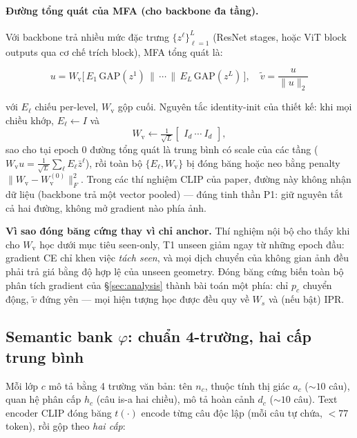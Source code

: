 \documentclass[10pt,twocolumn,letterpaper]{article}
\newcommand{\vtilde}{\tilde{v}}
\begin{document}
\paragraph{Đường tổng quát của MFA (cho backbone đa tầng).}
Với backbone trả nhiều mức đặc trưng $\{z^{\ell}\}_{\ell=1}^{L}$ (ResNet stages, hoặc ViT block outputs qua cơ chế trích block), MFA tổng quát là:

\begin{equation}
u = W_{\mathrm{v}}\big[\,E_1\,\mathrm{GAP}(z^{1})\,\|\,\cdots\,\|\,E_L\,\mathrm{GAP}(z^{L})\,\big],
\quad \vtilde = \frac{u}{\|u\|_2}
\label{eq:mfa-general}
\end{equation}

với $E_\ell$ chiếu per-level, $W_{\mathrm{v}}$ gộp cuối. Nguyên tắc identity-init của thiết kế: khi mọi chiều khớp, $E_\ell \leftarrow I$ và
\begin{equation}
W_{\mathrm{v}} \leftarrow \tfrac{1}{\sqrt{L}}
\begin{bmatrix} I_d \ \cdots\ I_d \end{bmatrix},
\label{eq:mfa-init}
\end{equation}
sao cho tại epoch 0 đường tổng quát là trung bình có scale của các tầng ($W_{\mathrm{v}}u = \frac{1}{\sqrt L}\sum_\ell E_\ell\bar z^\ell$), rồi toàn bộ $\{E_\ell, W_{\mathrm{v}}\}$ bị đóng băng hoặc neo bằng penalty $\|W_{\mathrm v}-W_{\mathrm v}^{(0)}\|_F^2$. Trong các thí nghiệm CLIP của paper, đường này không nhận dữ liệu (backbone trả một vector pooled) — đúng tinh thần P1: giữ nguyên tắt cả hai đường, không mở gradient nào phía ảnh.

\textbf{Vì sao đóng băng cứng thay vì chỉ anchor.} Thí nghiệm nội bộ cho thấy khi cho $W_{\mathrm v}$ học dưới mục tiêu seen-only, T1 unseen giảm ngay từ những epoch đầu: gradient CE chỉ khen việc \emph{tách seen}, và mọi dịch chuyển của không gian ảnh đều phải trả giá bằng độ hợp lệ của unseen geometry. Đóng băng cứng biến toàn bộ phân tích gradient của §\ref{sec:analysis} thành bài toán một phía: chỉ $p_c$ chuyển động, $\vtilde$ đứng yên — mọi hiện tượng học được đều quy về $W_s$ và (nếu bật) IPR.

\subsection{Semantic bank $\varphi$: chuẩn 4-trường, hai cấp trung bình}
\label{sec:phi}

Mỗi lớp $c$ mô tả bằng 4 trường văn bản: tên $n_c$, thuộc tính thị giác $a_c$ (${\sim}10$ câu), quan hệ phân cấp $h_c$ (câu is-a hai chiều), mô tả hoàn cảnh $d_c$ (${\sim}10$ câu). Text encoder CLIP đóng băng $t(\cdot)$ encode từng câu độc lập (mỗi câu tự chứa, $<77$ token), rồi gộp theo \emph{hai cấp}:
\end{document}
